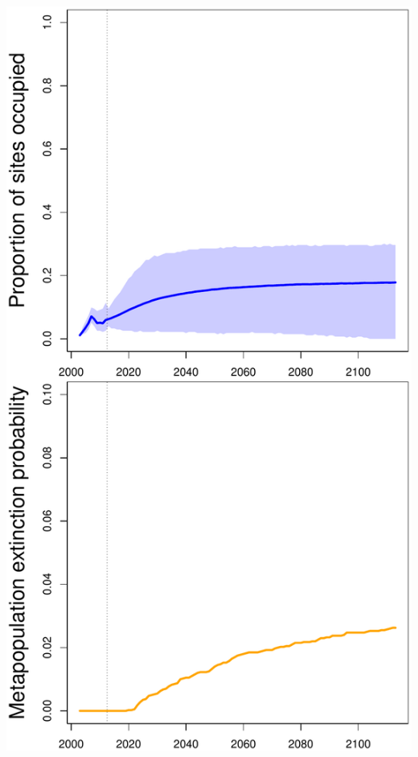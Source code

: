\documentclass[color=usenames,dvipsnames]{beamer}
\begin{document}
\begin{frame}
\begin{columns}
\begin{column}{0.4\textwidth}
\begin{center}
        \includegraphics[width=\textwidth]{figs/proj-ext-JAPPL}
      \end{center}
    \end{column}
  \end{columns}
\end{frame}
\end{document}
